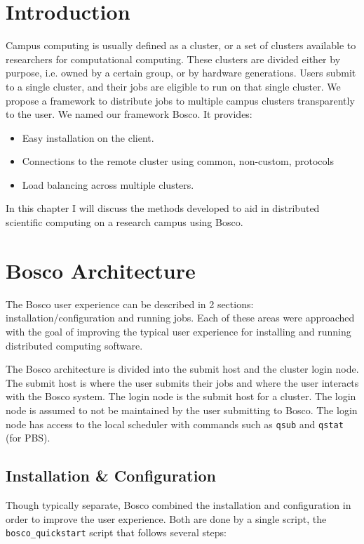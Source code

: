 \label{chapter:campusjobs} 
\section{Introduction}

Campus computing is usually defined as a cluster, or a set of clusters available to researchers for computational computing.  These clusters are divided either by purpose, i.e. owned by a certain group, or by hardware generations.  Users submit to a single cluster, and their jobs are eligible to run on that single cluster.  We propose a framework to distribute jobs to multiple campus clusters transparently to the user.  We named our framework Bosco.  It provides:
\begin{itemize}
\item Easy installation on the client.
\item Connections to the remote cluster using common, non-custom, protocols
\item Load balancing across multiple clusters.
\end{itemize}

In this chapter I will discuss the methods developed to aid in distributed scientific computing on a research campus using Bosco.  

\section{Bosco Architecture}
\label{sec:boscoarch}

% 

The Bosco user experience can be described in 2 sections: installation/configuration and running jobs.  Each of these areas were approached with the goal of improving the typical user experience for installing and running distributed computing software.

The Bosco architecture is divided into the submit host and the cluster login node.  The submit host is where the user submits their jobs and where the user interacts with the Bosco system.  The login node is the submit host for a cluster.  The login node is assumed to not be maintained by the user submitting to Bosco.  The login node has access to the local scheduler with commands such as \texttt{qsub} and \texttt{qstat} (for PBS).  

\subsection{Installation \& Configuration}
Though typically separate, Bosco combined the installation and configuration in order to improve the user experience.  Both are done by a single script, the \texttt{bosco\_quickstart} script that follows several steps:

